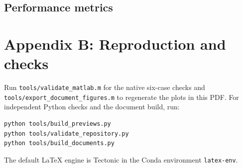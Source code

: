 \subsection*{Performance metrics}

\section*{Appendix B: Reproduction and checks}
Run \texttt{tools/validate\_matlab.m} for the native six-case checks and
\texttt{tools/export\_document\_figures.m} to regenerate the plots in this PDF.
For independent Python checks and the document build, run:
\begin{lstlisting}[language={},numbers=none]
python tools/build_previews.py
python tools/validate_repository.py
python tools/build_documents.py
\end{lstlisting}
The default LaTeX engine is Tectonic in the Conda environment \texttt{latex-env}.


